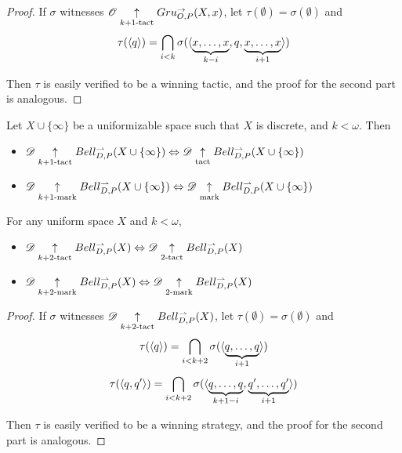 \begin{proof}
  If $\sigma$ witnesses $\mathscr{O}\underset{k+1\text{-tact}}{\uparrow}Gru_{O,P}^{\to}(X,x)$,
  let $\tau(\emptyset)=\sigma(\emptyset)$ and
    \[
      \tau(\langle q\rangle)
        =
      \bigcap_{i< k}
      \sigma(\langle\underbrace{x,\dots,x}_{k-i},q,\underbrace{x,\dots,x}_{i+1}\rangle)
    \]

  Then $\tau$ is easily verified to be a winning tactic, and
  the proof for the second part is analogous.
\end{proof}

\begin{cor}
  Let $X\cup\{\infty\}$ be a uniformizable space such that $X$ is discrete,
  and $k<\omega$. Then
  \begin{itemize}
    \item
      $
        \mathscr{D}\underset{k+1\text{-tact}}{\uparrow}Bell_{D,P}^{\rightharpoonup}(X\cup\{\infty\})
          \Leftrightarrow
        \mathscr{D}\underset{\text{tact}}{\uparrow}Bell_{D,P}^{\rightharpoonup}(X\cup\{\infty\})
      $
    \item
      $
        \mathscr{D}\underset{k+1\text{-mark}}{\uparrow}Bell_{D,P}^{\rightharpoonup}(X\cup\{\infty\})
          \Leftrightarrow
        \mathscr{D}\underset{\text{mark}}{\uparrow}Bell_{D,P}^{\rightharpoonup}(X\cup\{\infty\})
      $
  \end{itemize}
\end{cor}

\begin{prop} For any uniform space $X$ and $k<\omega$,
  \begin{itemize}
    \item
      $
        \mathscr{D}\underset{k+2\text{-tact}}{\uparrow}Bell_{D,P}^{\rightharpoonup}(X)
          \Leftrightarrow
        \mathscr{D}\underset{2\text{-tact}}{\uparrow}Bell_{D,P}^{\rightharpoonup}(X)
      $
    \item
      $
        \mathscr{D}\underset{k+2\text{-mark}}{\uparrow}Bell_{D,P}^{\rightharpoonup}(X)
          \Leftrightarrow
        \mathscr{D}\underset{2\text{-mark}}{\uparrow}Bell_{D,P}^{\rightharpoonup}(X)
      $
  \end{itemize}
\end{prop}

\begin{proof}
  If $\sigma$ witnesses $\mathscr{D}\underset{k+2\text{-tact}}{\uparrow}Bell_{D,P}^{\rightharpoonup}(X)$,
  let $\tau(\emptyset)=\sigma(\emptyset)$ and
    \[
      \tau(\langle q\rangle)
        =
      \bigcap_{i<k+2}
      \sigma(\langle\underbrace{q,\dots,q}_{i+1}\rangle)
    \]
    \[
      \tau(\langle q,q'\rangle)
        =
      \bigcap_{i<k+2}
      \sigma(\langle\underbrace{q,\dots,q}_{k+1-i},\underbrace{q',\dots,q'}_{i+1}\rangle)
    \]

  Then $\tau$ is easily verified to be a winning strategy, and
  the proof for the second part is analogous.
\end{proof}

